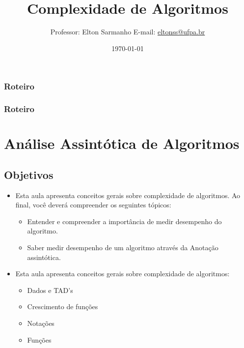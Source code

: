 \documentclass{beamer}
\title[Estrutura de Dados I]{Complexidade de Algoritmos}
\author[Elton Sarmanho]{ 
Professor: Elton Sarmanho\inst{1} 
\newline
E-mail: \href{mailto:eltonss@ufpa.br}{eltonss@ufpa.br}\newline
\href{https://github.com/eltonsarmanho}{\faGithub} \href{https://www.linkedin.com/in/elton-sarmanho-836553185/}{\faLinkedinSquare}
}
\institute[UFPA]{
   \inst{1}%
     Faculdade de Sistemas de Informação - UFPA/CUTINS
     }
\date{\today}
\begin{document}
\begin{frame}
\titlepage
\end{frame}

\begin{frame}
\frametitle{Roteiro}
\tableofcontents[sections={1-2}]
\end{frame}
\begin{frame}
\frametitle{Roteiro}
\tableofcontents[sections={3-4}]
\end{frame}
%
%
%
\section{Análise Assintótica de Algoritmos}
\subsection{Objetivos}
\begin{frame}{}
    
\begin{itemize}
 \item \hspace{-1 pt}Esta aula apresenta conceitos gerais sobre complexidade de algoritmos. Ao final, você deverá compreender os seguintes tópicos:
 \begin{itemize}
  \item Entender e compreender a importância de medir desempenho do algoritmo.
  \item Saber medir desempenho de um algoritmo através da Anotação assintótica.
  \end{itemize} 
\end{itemize}
\end{frame}
\begin{frame}{}
    
\begin{itemize}
 \item Esta aula apresenta conceitos gerais sobre complexidade de algoritmos:
 \begin{itemize}
  \item Dados e TAD's
  \item Crescimento de funções
  \item Notações
  \item Funções
 \end{itemize}

 
\end{itemize}

\end{frame}
\end{document}
